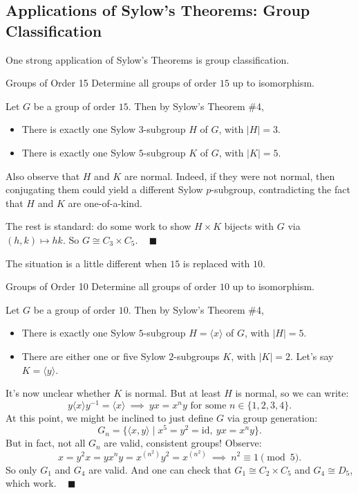 \subsection{Applications of Sylow's Theorems: Group Classification}

One strong application of Sylow's Theorems is group classification.

\begin{problem}{Groups of Order 15}
    Determine all groups of order $15$ up to isomorphism.
\end{problem}

\begin{solution}
    Let $G$ be a group of order $15$.  Then by Sylow's Theorem \#4,
    \begin{itemize}
        \item There is exactly one Sylow $3$-subgroup $H$ of $G$, with $|H| = 3$.
        \item There is exactly one Sylow $5$-subgroup $K$ of $G$, with $|K| = 5$.
    \end{itemize}
    Also observe that $H$ and $K$ are normal.  Indeed, if they were not normal, then conjugating them could yield a different Sylow $p$-subgroup, contradicting the fact that $H$ and $K$ are one-of-a-kind.

    The rest is standard: do some work to show $H \times K$ bijects with $G$ via $(h, k) \mapsto hk$.  So $G \cong C_3 \times C_5$. ~ $\blacksquare$
\end{solution}

The situation is a little different when $15$ is replaced with $10$.

\begin{problem}{Groups of Order 10}
    Determine all groups of order $10$ up to isomorphism.
\end{problem}

\begin{solution}
    Let $G$ be a group of order $10$.  Then by Sylow's Theorem \#4,
    \begin{itemize}
        \item There is exactly one Sylow $5$-subgroup $H = \langle x \rangle$ of $G$, with $|H| = 5$.
        \item There are either one or five Sylow $2$-subgroups $K$, with $|K| = 2$.  Let's say $K = \langle y \rangle$.
    \end{itemize}
    It's now unclear whether $K$ is normal.  But at least $H$ is normal, so we can write:
    \[ y \langle x \rangle y^{-1} = \langle x \rangle ~ \implies ~ yx = x^n y \text{ for some } n \in \{1, 2, 3, 4\}. \]
    At this point, we might be inclined to just define $G$ via group generation:
    \[ G_n = \{\langle x, y \rangle \mid x^5 = y^2 = \mathrm{id}, ~ yx = x^n y\}. \]
    But in fact, not all $G_n$ are valid, consistent groups!  Observe:
    \[ x = y^2 x = yx^n y = x^{(n^2)}y^2 = x^{(n^2)} ~ \implies ~ n^2 \equiv 1 \pmod{5}. \]
    So only $G_1$ and $G_4$ are valid.  And one can check that $G_1 \cong C_2 \times C_5$ and $G_4 \cong D_5$, which work. ~ $\blacksquare$
\end{solution}

